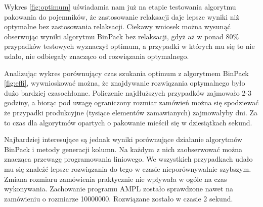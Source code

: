 Wykres \ref{fig:optimum} uświadamia nam już na etapie testowania algorytmu pakowania do pojemników, że zastosowanie relaksacji daje lepsze wyniki niż optymalne bez zastosowania relaksacji. Ciekawy wniosek można wysunąć obserwując wyniki algorytmu BinPack bez relaksacji, gdyż aż w ponad 80\% przypadków testowych wyznaczył optimum, a przypadki w których mu się to nie udało, nie odbiegały znacząco od rozwiązania optymalnego.

Analizując wykres porównujący czas szukania optimum z algorytmem BinPack \ref{fig:effi}, wywnioskować można, że znajdywanie rozwiązania optymalnego było dużo bardziej czasochłonne. Policzenie najdłuższych przypadków zajmowało 2-3 godziny, a biorąc pod uwagę ograniczony rozmiar zamówień można się spodziewać że przypadki produkcyjne (tysiące elementów zamawianych) zajmowałyby dni. Za to czas dla algorytmów opartych o pakowanie mieścił się w dziesiątkach sekund.

Najbardziej interesujące są jednak wyniki porównujące działanie algorytmów BinPack i metody generacji kolumn. Na każdym z nich zaobserwować można znacząca przewagę programowania liniowego. We wszystkich przypadkach udało mu się znaleźć lepsze rozwiązania do tego w czasie nieporównywalnie szybszym. Zmiana rozmiaru zamówienia praktycznie nie wpływała w ogóle na czas wykonywania. Zachowanie programu AMPL zostało sprawdzone nawet na zamówieniu o rozmiarze 10000000. Rozwiązane zostało w czasie 2 sekund.